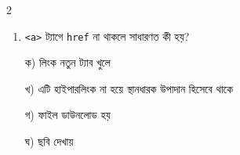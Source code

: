 \begin{multicols}{2}
\begin{enumerate}[leftmargin=*,itemsep=5pt]
\item \begin{minipage}[t]{\linewidth}\vspace{0pt}
\texttt{<a>} ট্যাগে \texttt{href} না থাকলে সাধারণত কী হয়?
\par ক) লিংক নতুন ট্যাব খুলে
\par খ) এটি হাইপারলিংক না হয়ে স্থানধারক উপাদান হিসেবে থাকে
\par গ) ফাইল ডাউনলোড হয়
\par ঘ) ছবি দেখায়
\end{minipage}
\end{enumerate}
\end{multicols}




